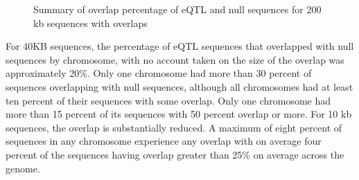 \documentclass[12pt, onecolumn, oneside]{gsajnl}
\begin{document}
\begin{figure}[!htbp]%
\centering
{}%
\qquad
{}%
\caption{Summary of overlap percentage of eQTL and null sequences for 200 kb sequences with overlaps}
\label{fig: 100kbOverlaps} 
\end{figure}  


For 40KB sequences, the percentage of eQTL sequences that overlapped with null sequences by chromosome, with no account taken on the size of the overlap 
was approximately 20\%. Only one chromosome had more than 30 percent of sequences overlapping with null sequences, although all chromosomes had at least ten percent of their sequences with some overlap. Only one chromosome had more than 15 percent of its sequences with 50 percent overlap or more. For 10 kb sequences, the overlap is substantially reduced. A maximum of eight percent of sequences in any chromosome experience any overlap with on average 
four percent of the sequences having overlap greater than 25\% on average across the genome.
\end{document}

